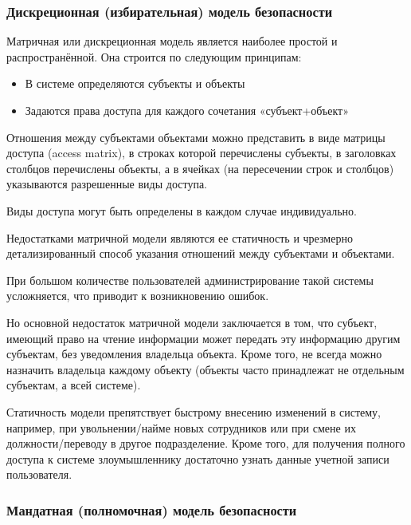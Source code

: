 \subsubsection{Дискреционная (избирательная) модель безопасности}
Матричная или дискреционная модель является наиболее простой и распространённой. Она строится по следующим принципам:
\begin{itemize}
	\item В системе определяются субъекты и объекты
	\item Задаются права доступа для каждого сочетания «субъект+объект»
\end{itemize}
Отношения между субъектами объектами можно представить в виде матрицы доступа (access matrix), в строках которой перечислены субъекты, в заголовках столбцов перечислены объекты, а в ячейках (на пересечении строк и столбцов) указываются разрешенные виды доступа.

Виды доступа могут быть определены в каждом случае индивидуально.

Недостатками матричной модели являются ее статичность и чрезмерно детализированный способ указания отношений между субъектами и объектами.

При большом количестве пользователей администрирование такой системы усложняется, что приводит к возникновению ошибок.

Но основной недостаток матричной модели заключается в том, что субъект, имеющий право на чтение информации может передать эту информацию другим субъектам, без уведомления владельца объекта. Кроме того, не всегда можно назначить владельца каждому объекту (объекты часто принадлежат не отдельным субъектам, а всей системе).

Статичность модели препятствует быстрому внесению изменений в систему, например, при увольнении/найме новых сотрудников или при смене их должности/переводу в другое подразделение.
Кроме того, для получения полного доступа к системе злоумышленнику достаточно узнать данные учетной записи пользователя. 

\subsubsection{Мандатная (полномочная) модель безопасности}

